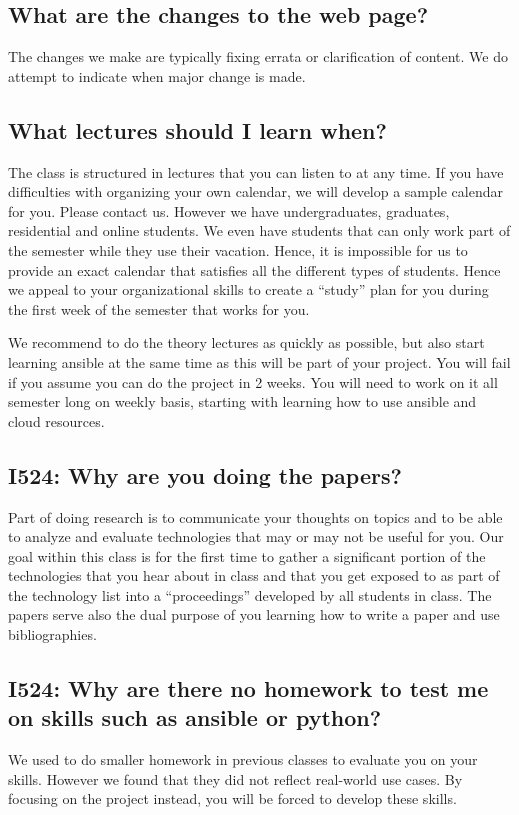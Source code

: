 \subsection{What are the changes to the web page?}
\label{\detokenize{faq:what-are-the-changes-to-the-web-page}}
The changes we make are typically fixing errata or clarification of
content. We do attempt to indicate when major change is made.


\subsection{What lectures should I learn when?}
\label{\detokenize{faq:what-lectures-should-i-learn-when}}
The class is structured in lectures that you can listen to at any
time. If you have difficulties with organizing your own calendar, we
will develop a sample calendar for you. Please contact us. However we
have undergraduates, graduates, residential and online students. We
even have students that can only work part of the semester while they
use their vacation. Hence, it is impossible for us to provide an exact
calendar that satisfies all the different types of students. Hence we
appeal to your organizational skills to create a ``study'' plan for you
during the first week of the semester that works for you.

We recommend to do the theory lectures as quickly as possible, but
also start learning ansible at the same time as this will be part of
your project. You will fail if you assume you can do the project in 2
weeks. You will need to work on it all semester long on weekly basis,
starting with learning how to use ansible and cloud resources.


\subsection{I524: Why are you doing the papers?}
\label{\detokenize{faq:i524-why-are-you-doing-the-papers}}
Part of doing research is to communicate your thoughts on topics and
to be able to analyze and evaluate technologies that may or may not be
useful for you. Our goal within this class is for the first time to
gather a significant portion of the technologies that you hear about
in class and that you get exposed to as part of the technology list
into a ``proceedings'' developed by all students in class. The papers
serve also the dual purpose of you learning how to write a paper and
use bibliographies.


\subsection{I524: Why are there no homework to test me on skills such as ansible or python?}
\label{\detokenize{faq:i524-why-are-there-no-homework-to-test-me-on-skills-such-as-ansible-or-python}}
We used to do smaller homework in previous classes to evaluate you on
your skills. However we found that they did not reflect real-world use
cases. By focusing on the project instead, you will be forced to
develop these skills.

